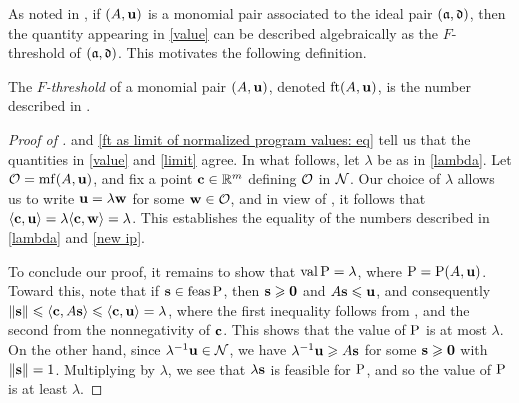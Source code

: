 \documentclass{amsart}
\begin{document}
As noted in , if $(A,\mathbf{u})$ is a monomial pair associated to the ideal pair $(\mathfrak{a},\mathfrak{d})$, then the quantity appearing in \ref{value} can be described algebraically as the $F$-threshold of $(\mathfrak{a},\mathfrak{d})$.
This motivates the following definition.

\begin{definition}
\label{FT: D}
   The \emph{$F$-threshold} of a monomial pair $(A, \mathbf{u})$, denoted $\operatorname{ft}(A, \mathbf{u})$, is the number described in .
\end{definition}

\begin{proof}[Proof of ]
    and \eqref{ft as limit of normalized program values: eq} tell us that the quantities in \ref{value} and \ref{limit} agree.  In what follows, let $\lambda$ be as in \ref{lambda}.
   Let $\mathcal{O} = \operatorname{mf}(A,\mathbf{u})$, and fix a point $\mathbf{c} \in \mathbb{R}^m$ defining $\mathcal{O}$ in $\mathcal{N}$.
   Our choice of $\lambda$ allows us to write $\mathbf{u} = \lambda \mathbf{w}$ for some $\mathbf{w} \in \mathcal{O}$, and in view of , it follows that $\langle \mathbf{c}, \mathbf{u} \rangle = \lambda \langle \mathbf{c}, \mathbf{w} \rangle = \lambda$.
   This establishes the equality of the numbers described in \ref{lambda} and \ref{new ip}.

   To conclude our proof, it remains to show that $\operatorname{val} \mathrm{P} = \lambda$, where $\mathrm{P} = \mathrm{P}(A, \mathbf{u})$.
   Toward this, note that if $\mathbf{s} \in \operatorname{feas} \mathrm{P}$, then $\mathbf{s}\geqslant \mathbf{0}$ and $A \mathbf{s} \leqslant \mathbf{u}$, and consequently $\| \mathbf{s} \| \leqslant \langle \mathbf{c}, A \mathbf{s} \rangle \leqslant \langle \mathbf{c}, \mathbf{u} \rangle = \lambda$, where the first inequality follows from , and the second from the nonnegativity of $\mathbf{c}$.
   This shows that the value of $\mathrm{P}$ is at most $\lambda$.
   On the other hand, since $\lambda^{-1}\mathbf{u} \in \mathcal{N}$, we have $\lambda^{-1}\mathbf{u} \geqslant A\mathbf{s}$ for some $\mathbf{s} \geqslant \mathbf{0}$ with $\| \mathbf{s} \| = 1$.
   Multiplying by $\lambda$, we see that  $\lambda\mathbf{s}$ is feasible for $\mathrm{P}$, and so the value of $\mathrm{P}$ is at least $\lambda$.
\end{proof}
\end{document}
